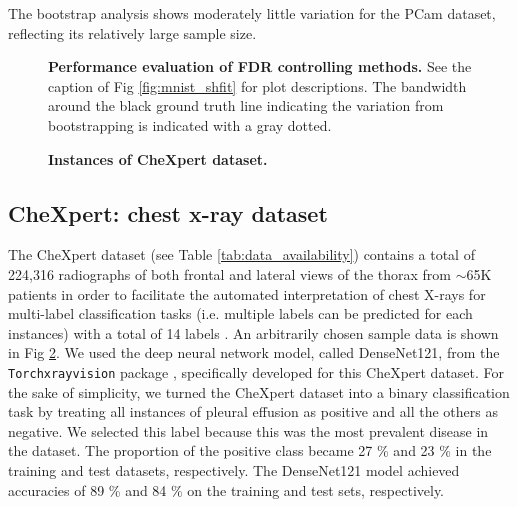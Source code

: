\documentclass[10pt,letterpaper]{article}
\begin{document}
The bootstrap analysis shows moderately little variation for the PCam dataset, reflecting its relatively large sample size.




\begin{figure}[h!]
	
	\caption{{\bf Performance evaluation of FDR controlling methods.} See the caption of Fig \ref{fig:mnist_shfit} for plot descriptions. The bandwidth around the black ground truth line indicating the variation from bootstrapping is indicated with a gray dotted.}
	\label{fig:I}
\end{figure} 

\begin{figure}[h!]
	\centering
	\caption{{\bf Instances of CheXpert dataset.}}
	\label{fig:CheXpert_example}
\end{figure} 

\subsection*{CheXpert: chest x-ray dataset}

The CheXpert dataset (see Table \ref{tab:data_availability}) contains a total of 224,316 radiographs of both frontal and lateral views of the thorax from $\sim$65K patients in order to facilitate the automated interpretation of chest X-rays for multi-label classification tasks (i.e. multiple labels can be predicted for each instances) with a total of 14 labels \cite{irvin2019chexpert}.
An arbitrarily chosen sample data is shown in Fig \ref{fig:CheXpert_example}.
We used the deep neural network model, called DenseNet121, from the \texttt{Torchxrayvision} package \cite{cohen2020limits,Cohen2022xrv}, specifically developed for this CheXpert dataset.
For the sake of simplicity, we turned the CheXpert dataset into a binary classification task by treating all instances of pleural effusion as positive and all the others as negative.
We selected this label because this was the most prevalent  disease in the dataset.
The proportion of the positive class became 27 \% and 23 \% in the training and test datasets, respectively.
The DenseNet121 model achieved accuracies of 89 \% and 84 \% on the training and test sets, respectively.
\end{document}
